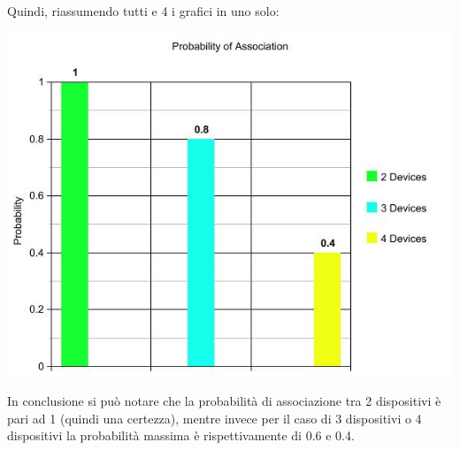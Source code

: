 Quindi, riassumendo tutti e 4 i grafici in uno solo:
\begin{center}
\includegraphics[width=1\textwidth]{imgs/probability_of_association.jpg}
\label{probabilityofassociation_img}%
\end{center}

In conclusione si può notare che la probabilità di associazione tra 2 dispositivi è pari ad 1 (quindi una certezza), mentre invece per il caso di 3 dispositivi o 4 dispositivi la probabilità massima è rispettivamente di 0.6 e 0.4.

\clearpage{\pagestyle{empty}\cleardoublepage}